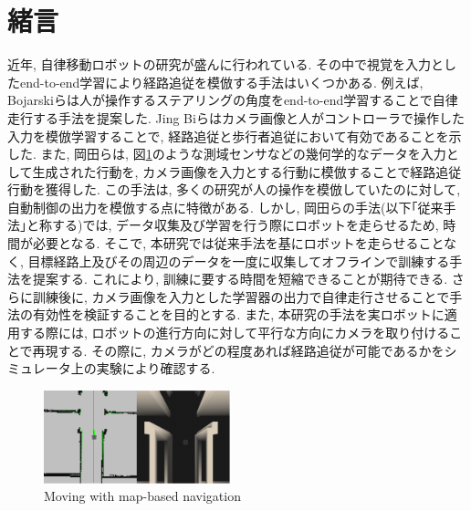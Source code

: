 \documentclass{ujarticle}
\begin{document}
\small
\section{緒言}%
近年, 自律移動ロボットの研究が盛んに行われている. その中で視覚を入力としたend-to-end学習により経路追従を模倣する手法はいくつかある. 例えば, Bojarskiら\cite{bojarski}は人が操作するステアリングの角度をend-to-end学習することで自律走行する手法を提案した. Jing Biら\cite{pedestrian}はカメラ画像と人がコントローラで操作した入力を模倣学習することで, 経路追従と歩行者追従において有効であることを示した. また, 岡田ら\cite{si2020-okada}\cite{si2021-okada}は, 図\ref{Fig:navigation}のような測域センサなどの幾何学的なデータを入力として生成された行動を, カメラ画像を入力とする行動に模倣することで経路追従行動を獲得した. この手法は, 多くの研究\cite{bojarski}\cite{pedestrian}が人の操作を模倣していたのに対して, 自動制御の出力を模倣する点に特徴がある. しかし, 岡田らの手法(以下｢従来手法｣と称する)では, データ収集及び学習を行う際にロボットを走らせるため, 時間が必要となる. そこで, 本研究では従来手法を基にロボットを走らせることなく, 目標経路上及びその周辺のデータを一度に収集してオフラインで訓練する手法を提案する. これにより, 訓練に要する時間を短縮できることが期待できる. さらに訓練後に, カメラ画像を入力とした学習器の出力で自律走行させることで手法の有効性を検証することを目的とする. また, 本研究の手法を実ロボットに適用する際には, ロボットの進行方向に対して平行な方向にカメラを取り付けることで再現する. その際に, カメラがどの程度あれば経路追従が可能であるかをシミュレータ上の実験により確認する. 

\begin{figure}[h]
	\centering
	\includegraphics[width=0.48\textwidth]{img/navigation.png}
	\caption{Moving with map-based navigation}
	\label{Fig:navigation}
\end{figure}
\end{document}
